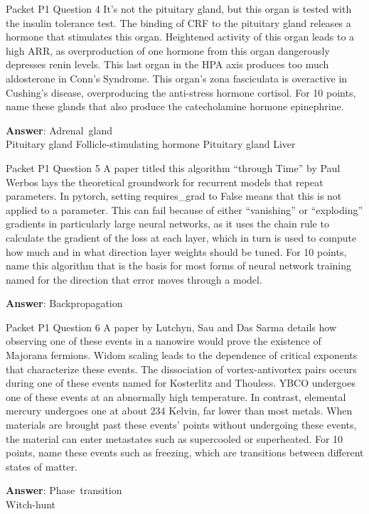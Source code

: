 \begin{frame}{Packet P1 Question 4}
It's not the pituitary gland, but this organ     is tested with the insulin tolerance test. The binding of CRF to the pituitary gland releases a hormone that stimulates this organ. Heightened activity of this organ leads to a high ARR, as overproduction of one hormone from this organ dangerously   depresses renin levels. This last organ in the HPA axis produces too much aldosterone in Conn's Syndrome. This organ's zona fasciculata   is overactive in Cushing’s disease,   overproducing the anti-stress hormone cortisol. For 10 points, name these glands that also produce the catecholamine hormone epinephrine.  

\textbf{Answer}: Adrenal\ gland\\
 Pituitary gland
 Follicle-stimulating hormone
 Pituitary gland
 Liver
\end{frame}

\begin{frame}{Packet P1 Question 5}
A paper titled this algorithm ``through Time'' by Paul Werbos lays the theoretical groundwork for recurrent models that repeat parameters.  In pytorch, setting requires\_grad to False means that this is not applied to a parameter.  This can fail because of either ``vanishing'' or ``exploding'' gradients in particularly large neural networks, as it uses the chain rule to calculate the gradient of the loss at each layer, which     in turn is used to compute how much and in what direction layer weights should be   tuned. For 10 points, name this algorithm   that is the basis for most forms of neural network training named for the direction that error moves through a model.

\textbf{Answer}: Backpropagation\\
\end{frame}

\begin{frame}{Packet P1 Question 6}
A paper by Lutchyn, Sau and Das Sarma details how observing one of these events in a nanowire would prove the existence of Majorana fermions. Widom scaling leads to the dependence of critical exponents   that characterize these events. The dissociation of vortex-antivortex pairs occurs during one of these events named for Kosterlitz and Thouless.     YBCO undergoes one of these events at an abnormally high temperature. In contrast, elemental mercury undergoes one at about 234 Kelvin, far lower than most metals. When materials are brought past these events' points without undergoing these events, the material can enter metastates such as supercooled or superheated. For 10 points, name these events such as freezing, which are transitions between different states of matter.  

\textbf{Answer}: Phase\ transition\\
 Witch-hunt
\end{frame}


